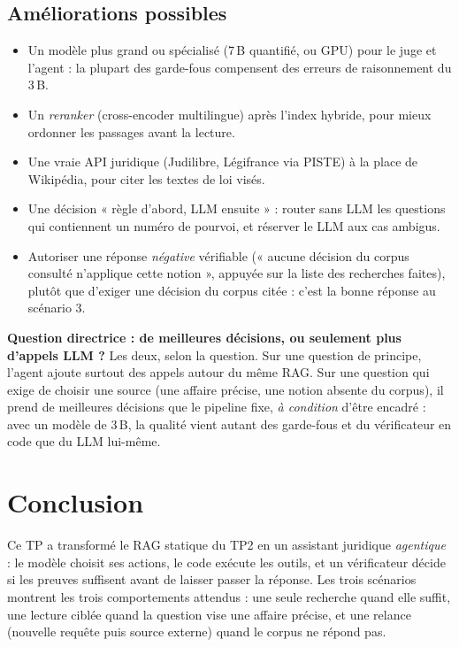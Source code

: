 \documentclass[11pt,a4paper]{article}
\begin{document}
\subsection{Améliorations possibles}
\begin{itemize}
  \item Un modèle plus grand ou spécialisé (7\,B quantifié, ou GPU) pour le juge et l'agent : la plupart des garde-fous compensent des erreurs de raisonnement du 3\,B.
  \item Un \emph{reranker} (cross-encoder multilingue) après l'index hybride, pour mieux ordonner les passages avant la lecture.
  \item Une vraie API juridique (Judilibre, Légifrance via PISTE) à la place de Wikipédia, pour citer les textes de loi visés.
  \item Une décision « règle d'abord, LLM ensuite » : router sans LLM les questions qui contiennent un numéro de pourvoi, et réserver le LLM aux cas ambigus.
  \item Autoriser une réponse \emph{négative} vérifiable (« aucune décision du corpus consulté n'applique cette notion », appuyée sur la liste des recherches faites), plutôt que d'exiger une décision du corpus citée : c'est la bonne réponse au scénario 3.
\end{itemize}

\begin{keybox}
\textbf{Question directrice : de meilleures décisions, ou seulement plus d'appels LLM ?}
Les deux, selon la question. Sur une question de principe, l'agent ajoute surtout des appels autour du
même RAG. Sur une question qui exige de choisir une source (une affaire précise, une notion absente du
corpus), il prend de meilleures décisions que le pipeline fixe, \emph{à condition} d'être encadré : avec
un modèle de 3\,B, la qualité vient autant des garde-fous et du vérificateur en code que du LLM lui-même.
\end{keybox}

\section{Conclusion}

Ce TP a transformé le RAG statique du TP2 en un assistant juridique \emph{agentique} : le modèle
choisit ses actions, le code exécute les outils, et un vérificateur décide si les preuves suffisent
avant de laisser passer la réponse. Les trois scénarios montrent les trois comportements attendus :
une seule recherche quand elle suffit, une lecture ciblée quand la question vise une affaire précise,
et une relance (nouvelle requête puis source externe) quand le corpus ne répond pas.
\end{document}
